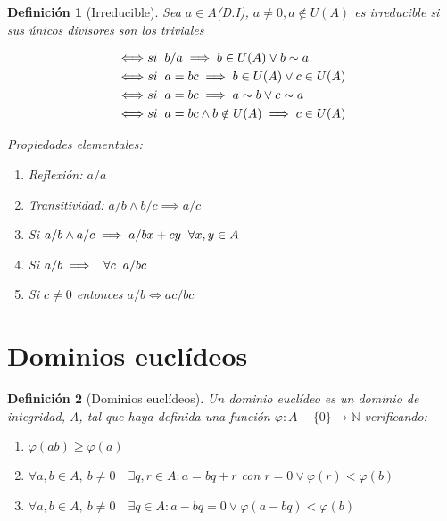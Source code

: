\documentclass[11pt, a4paper, titlepage]{article}
\theoremstyle{theorem-style}
\theoremstyle{definition-style}
\newtheorem*{ndef}{Definición}
\theoremstyle{remark-style}
\theoremstyle{example-style}
\newenvironment{nlist}
{\begin{enumerate}
\renewcommand\labelenumi{(\emph{\roman{enumi})}}}
{\end{enumerate}}
\begin{document}
\begin{ndef}[Irreducible]
	
	Sea $a\in A$(D.I), $a\neq 0, a \notin U(A)$ es irreducible si sus únicos divisores son los triviales

\begin{align}
	\iff& si\hspace{0.2cm} b/a \implies b\in U(A) \vee b \sim a
\\
	\iff& si \hspace{0.2cm} a=bc \implies b\in U(A) \vee c \in U(A)
\\
	\iff& si \hspace{0.2cm} a=bc \implies a\sim b \vee c \sim a
\\
	\iff& si \hspace{0.2cm}a=bc \wedge b \notin U(A) \implies c \in U(A)
\end{align}
	
Propiedades elementales:
\begin{nlist}
	\item Reflexión: $a/a$
	\item Transitividad: $a/b \wedge b/c \implies a/c$
	\item Si $a/b \wedge a/c \implies a/bx +cy\hspace{0.2cm} \forall x,y \in A$ 
	\item Si $a/b \implies \hspace{0.2cm} \forall c \hspace{0.2cm} a/bc$
	\item Si $c\neq 0$ entonces $a/b \iff ac/bc$
\end{nlist}
\end{ndef}

\section{Dominios euclídeos}
\begin{ndef}[Dominios euclídeos]

	Un dominio euclídeo es un dominio de integridad, A, tal que haya definida una función $\varphi: A- \{0\} \to \mathbb{N} $ verificando:

\begin{nlist}
	\item $\varphi(ab) \ge \varphi(a)$
	\item $\forall a,b \in A,\ b \neq 0 \quad \exists q,r \in A : a = bq + r $ con $r=0 \vee \varphi(r) < \varphi(b)$
	\item $\forall a,b \in A,\ b \neq 0 \quad \exists q \in A : a - bq = 0 \vee  \varphi(a-bq) < \varphi(b)$
\end{nlist}	
\end{ndef}
\end{document}
